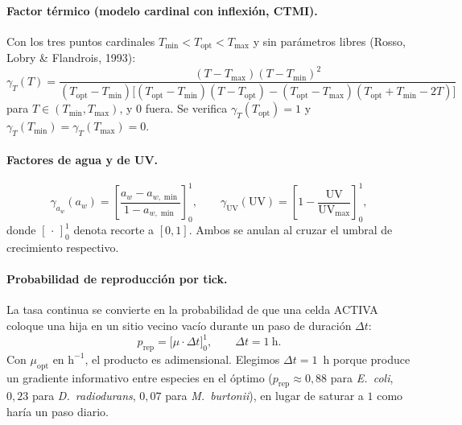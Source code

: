 \documentclass[11pt]{article}
\newcommand{\ACTIVA}{\textcolor{acactiva}{\textsf{ACTIVA}}}
\begin{document}
\paragraph{Factor térmico (modelo cardinal con inflexión, CTMI).} Con los tres
puntos cardinales $T_{\min}<T_{\mathrm{opt}}<T_{\max}$ y sin parámetros libres
(Rosso, Lobry \& Flandrois, 1993):
\begin{equation}
\gamma_T(T)=\frac{(T-T_{\max})(T-T_{\min})^2}
{(T_{\mathrm{opt}}-T_{\min})\big[(T_{\mathrm{opt}}-T_{\min})(T-T_{\mathrm{opt}})-(T_{\mathrm{opt}}-T_{\max})(T_{\mathrm{opt}}+T_{\min}-2T)\big]}
\end{equation}
para $T\in(T_{\min},T_{\max})$, y $0$ fuera. Se verifica $\gamma_T(T_{\mathrm{opt}})=1$
y $\gamma_T(T_{\min})=\gamma_T(T_{\max})=0$.

\paragraph{Factores de agua y de UV.}
\begin{equation}
\gamma_{a_w}(a_w)=\left[\frac{a_w-a_{w,\min}}{1-a_{w,\min}}\right]_0^1,\qquad
\gamma_{\mathrm{UV}}(\mathrm{UV})=\left[1-\frac{\mathrm{UV}}{\mathrm{UV}_{\max}}\right]_0^1,
\end{equation}
donde $[\,\cdot\,]_0^1$ denota recorte a $[0,1]$. Ambos se anulan al cruzar el
umbral de crecimiento respectivo.

\paragraph{Probabilidad de reproducción por tick.} La tasa continua se convierte en
la probabilidad de que una celda \ACTIVA{} coloque una hija en un sitio vecino
vacío durante un paso de duración $\Delta t$:
\begin{equation}
p_{\mathrm{rep}}=\big[\mu\cdot\Delta t\big]_0^1,\qquad \Delta t = 1\ \text{h}.
\end{equation}
Con $\mu_{\mathrm{opt}}$ en $\mathrm{h}^{-1}$, el producto es adimensional. Elegimos
$\Delta t=1$~h porque produce un gradiente informativo entre especies en el óptimo
($p_{\mathrm{rep}}\approx 0{,}88$ para \emph{E.\ coli}, $0{,}23$ para
\emph{D.\ radiodurans}, $0{,}07$ para \emph{M.\ burtonii}), en lugar de saturar a
$1$ como haría un paso diario.
\end{document}
